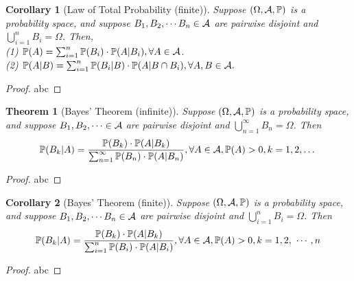 \documentclass[openany,12pt]{book}
\newtheorem{theorem}{Theorem}[chapter]
\newtheorem{corollary}{Corollary}[chapter]
\begin{document}
\begin{corollary}[Law of Total Probability (finite)]
Suppose $(\Omega,\mathcal{A},\mathbb{P})$ is a probability space, and suppose $B_1,B_2,\cdots B_n\in\mathcal{A}$ are pairwise disjoint and $\bigcup_{i=1}^n B_i=\Omega$. Then,\\
(1) $\mathbb{P}(A)=\sum_{i=1}^{n} \mathbb{P}(B_i )\cdot \mathbb{P}(A|B_i ),\forall A\in\mathcal{A}$.\\
(2) $\mathbb{P}(A|B)=\sum_{i=1}^{n} \mathbb{P}(B_i |B)\cdot \mathbb{P}(A|B\cap B_i ),\forall A,B\in\mathcal{A}.$
\end{corollary}

\begin{proof}
  abc
\end{proof}

\begin{theorem}[Bayes' Theorem (infinite)]
Suppose $(\Omega,\mathcal{A},\mathbb{P})$ is a probability space, and suppose $B_1,B_2,\cdots\in\mathcal{A}$ are pairwise disjoint and $\bigcup_{n=1}^\infty B_n=\Omega$.  Then $$\mathbb{P}(B_k|A)=\frac{\mathbb{P}(B_k)\cdot \mathbb{P}(A|B_k)}{\sum_{n=1}^{\infty} \mathbb{P}(B_n )\cdot \mathbb{P}(A|B_n )},\forall A\in\mathcal{A}, \mathbb{P}(A)>0,k=1,2,\dots$$
\end{theorem}

\begin{proof}
  abc
\end{proof}

\begin{corollary}[Bayes' Theorem (finite)]
Suppose $(\Omega,\mathcal{A},\mathbb{P})$ is a probability space, and suppose $B_1,B_2,\cdots B_n\in\mathcal{A}$ are pairwise disjoint and $\bigcup_{i=1}^n B_i=\Omega$.  Then $$\mathbb{P}(B_k|A)=\frac{\mathbb{P}(B_k)\cdot \mathbb{P}(A|B_k)}{\sumin \mathbb{P}(B_i )\cdot \mathbb{P}(A|B_i )},\forall A\in\ma, \mathbb{P}(A)>0,k=1,2,\ \cdots,n$$
\end{corollary}

\begin{proof}
  abc
\end{proof}
\end{document}
